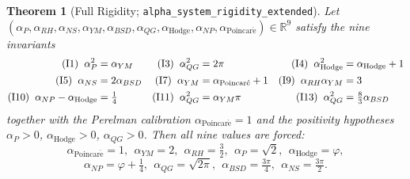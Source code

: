 \documentclass[11pt,a4paper]{article}
\newtheorem{theorem}{Theorem}
\theoremstyle{definition}
\begin{document}
\begin{theorem}[Full Rigidity;
\texttt{alpha\_system\_rigidity\_extended}]
\label{thm:rigidity}
Let $(\alpha_P, \alpha_{RH}, \alpha_{NS}, \alpha_{YM}, \alpha_{BSD},
\alpha_{QG}, \alpha_{\mathrm{Hodge}}, \alpha_{NP},
\alpha_{\mathrm{Poincar\acute{e}}}) \in \mathbb{R}^9$ satisfy the
nine invariants
\begin{align*}
\textnormal{(I1)} \;\; \alpha_P^2 &= \alpha_{YM}
& \textnormal{(I3)} \;\; \alpha_{QG}^2 &= 2\pi
& \textnormal{(I4)} \;\; \alpha_{\mathrm{Hodge}}^2 &= \alpha_{\mathrm{Hodge}} + 1 \\
\textnormal{(I5)} \;\; \alpha_{NS} &= 2 \alpha_{BSD}
& \textnormal{(I7)} \;\; \alpha_{YM} &= \alpha_{\mathrm{Poincar\acute{e}}} + 1
& \textnormal{(I9)} \;\; \alpha_{RH} \alpha_{YM} &= 3 \\
\textnormal{(I10)} \;\; \alpha_{NP} - \alpha_{\mathrm{Hodge}} &= \tfrac{1}{4}
& \textnormal{(I11)} \;\; \alpha_{QG}^2 &= \alpha_{YM} \pi
& \textnormal{(I13)} \;\; \alpha_{QG}^2 &= \tfrac{8}{3} \alpha_{BSD}
\end{align*}
together with the Perelman calibration
$\alpha_{\mathrm{Poincar\acute{e}}} = 1$ and the positivity
hypotheses $\alpha_P > 0$, $\alpha_{\mathrm{Hodge}} > 0$,
$\alpha_{QG} > 0$. Then all nine values are forced:
\[
\alpha_{\mathrm{Poincar\acute{e}}} = 1,\ \
\alpha_{YM} = 2,\ \
\alpha_{RH} = \tfrac{3}{2},\ \
\alpha_P = \sqrt{2},\ \
\alpha_{\mathrm{Hodge}} = \varphi,
\]
\[
\alpha_{NP} = \varphi + \tfrac{1}{4},\ \
\alpha_{QG} = \sqrt{2\pi},\ \
\alpha_{BSD} = \tfrac{3\pi}{4},\ \
\alpha_{NS} = \tfrac{3\pi}{2}.
\]
\end{theorem}
\end{document}
